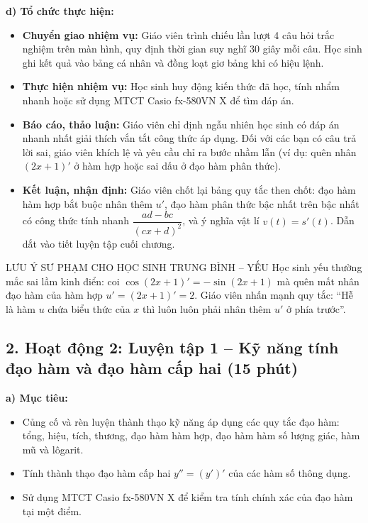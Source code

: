 \documentclass[12pt, a4paper]{article}
\begin{document}
\noindent \textbf{d) Tổ chức thực hiện:}
\begin{itemize}[leftmargin=0.6cm]
    \item \textbf{Chuyển giao nhiệm vụ:} Giáo viên trình chiếu lần lượt 4 câu hỏi trắc nghiệm trên màn hình, quy định thời gian suy nghĩ 30 giây mỗi câu. Học sinh ghi kết quả vào bảng cá nhân và đồng loạt giơ bảng khi có hiệu lệnh.
    \item \textbf{Thực hiện nhiệm vụ:} Học sinh huy động kiến thức đã học, tính nhẩm nhanh hoặc sử dụng MTCT Casio fx-580VN X để tìm đáp án.
    \item \textbf{Báo cáo, thảo luận:} Giáo viên chỉ định ngẫu nhiên học sinh có đáp án nhanh nhất giải thích vắn tắt công thức áp dụng. Đối với các bạn có câu trả lời sai, giáo viên khích lệ và yêu cầu chỉ ra bước nhầm lẫn (ví dụ: quên nhân $(2x+1)'$ ở hàm hợp hoặc sai dấu ở đạo hàm phân thức).
    \item \textbf{Kết luận, nhận định:} Giáo viên chốt lại bảng quy tắc then chốt: đạo hàm hàm hợp bắt buộc nhân thêm $u'$, đạo hàm phân thức bậc nhất trên bậc nhất có công thức tính nhanh $\dfrac{ad - bc}{(cx + d)^2}$, và ý nghĩa vật lí $v(t) = s'(t)$. Dẫn dắt vào tiết luyện tập cuối chương.
\end{itemize}

\begin{pedabox}{LƯU Ý SƯ PHẠM CHO HỌC SINH TRUNG BÌNH -- YẾU}
Học sinh yếu thường mắc sai lầm kinh điển: coi $\cos(2x+1)' = -\sin(2x+1)$ mà quên mất nhân đạo hàm của hàm hợp $u' = (2x+1)' = 2$. Giáo viên nhấn mạnh quy tắc: ``Hễ là hàm $u$ chứa biểu thức của $x$ thì luôn luôn phải nhân thêm $u'$ ở phía trước''.
\end{pedabox}

\vspace{5pt}

\subsection*{2. Hoạt động 2: Luyện tập 1 -- Kỹ năng tính đạo hàm và đạo hàm cấp hai (15 phút)}

\noindent \textbf{a) Mục tiêu:}
\begin{itemize}[leftmargin=0.6cm]
    \item Củng cố và rèn luyện thành thạo kỹ năng áp dụng các quy tắc đạo hàm: tổng, hiệu, tích, thương, đạo hàm hàm hợp, đạo hàm hàm số lượng giác, hàm mũ và lôgarit.
    \item Tính thành thạo đạo hàm cấp hai $y'' = (y')'$ của các hàm số thông dụng.
    \item Sử dụng MTCT Casio fx-580VN X để kiểm tra tính chính xác của đạo hàm tại một điểm.
\end{itemize}
\end{document}
